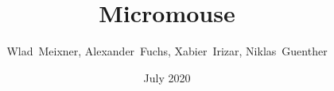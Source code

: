 \title{Micromouse}
\date{July 2020}
\author{Wlad~Meixner, Alexander~Fuchs, Xabier~Irizar, Niklas~Guenther}
\subject{Lab Report}
\publishers{}
\maketitle
\tableofcontents
\clearpage

